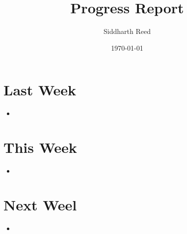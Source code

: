 \documentclass[10pt,letter]{article}
\title{Progress Report}
\author{Siddharth Reed}
\date{\today}
\begin{document}
\section*{Last Week}
\begin{itemize}
    \item
\end{itemize}

\section*{This Week}
\begin{itemize}
    \item
\end{itemize}

\section*{Next Weel}
\begin{itemize}
    \item
\end{itemize}
\end{document}
